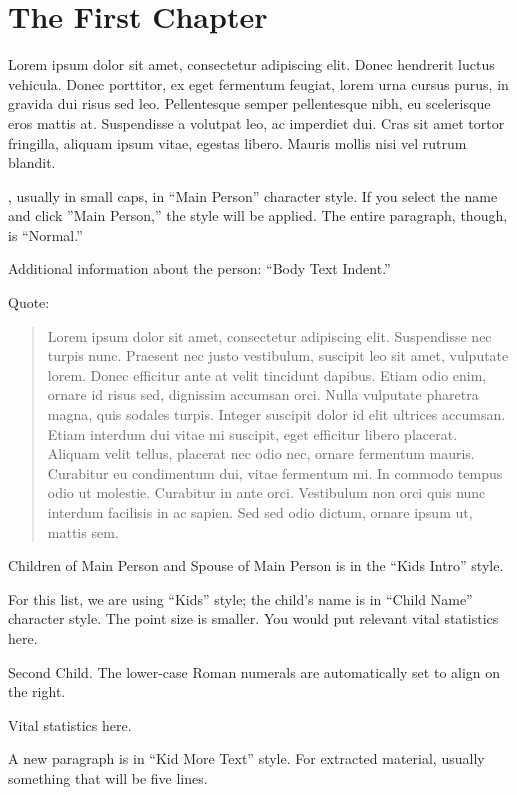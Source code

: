 \chapter{The First Chapter}

 Lorem ipsum dolor sit amet, consectetur adipiscing elit. Donec hendrerit luctus vehicula. Donec porttitor, ex eget fermentum feugiat, lorem urna\cite{lamport94} cursus purus, in gravida dui risus sed leo. Pellentesque semper pellentesque nibh, eu scelerisque eros mattis at. Suspendisse a volutpat leo, ac imperdiet dui. Cras sit amet tortor fringilla, aliquam ipsum vitae, egestas libero. Mauris mollis nisi vel rutrum blandit. 

, usually in small caps, in ``Main Person'' character style. If you select the name and click ''Main Person,'' the style will be applied. The entire paragraph, though, is ``Normal.''
	
Additional information about the person: ``Body Text Indent.''

Quote:

\begin{quote}
	Lorem ipsum dolor sit amet, consectetur adipiscing elit. Suspendisse nec turpis nunc. Praesent nec justo vestibulum, suscipit leo sit amet, vulputate lorem. Donec efficitur ante at velit tincidunt dapibus. Etiam odio enim, ornare id risus sed, dignissim accumsan orci. Nulla vulputate pharetra magna, quis sodales turpis. Integer suscipit dolor id elit ultrices accumsan. Etiam interdum dui vitae mi suscipit, eget efficitur libero placerat. Aliquam velit tellus, placerat nec odio nec, ornare fermentum mauris. Curabitur eu condimentum dui, vitae fermentum mi. In commodo tempus odio ut molestie. Curabitur in ante orci. Vestibulum non orci quis nunc interdum facilisis in ac sapien. Sed sed odio dictum, ornare ipsum ut, mattis sem. 
\end{quote}

\begin{KidsIntro}
	Children of Main Person and Spouse of Main Person is in the ``Kids Intro'' style.
\end{KidsIntro}

\begin{Kids}

	 For this list, we are using ``Kids'' style; the child's name is in ``Child Name'' character style. The point size is smaller. You would put relevant vital statistics here.
	
	Second Child. The lower-case Roman numerals are automatically set to align on the right.
	
	 Vital statistics here.
	
	\begin{KidsMoreText}A new paragraph is in ``Kid More Text'' style. For extracted material, usually something that will be five lines.\end{KidsMoreText}

\end{Kids}

